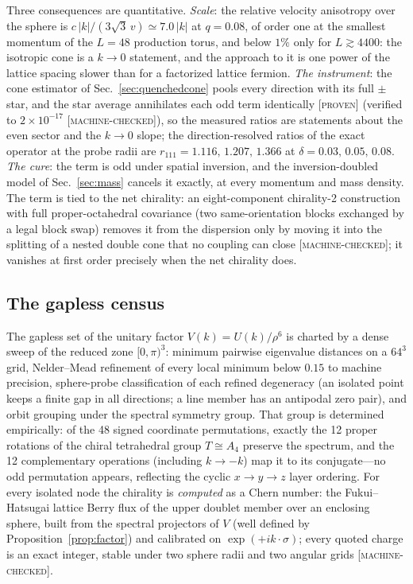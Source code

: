 \documentclass[aps,prd,twocolumn,superscriptaddress,nofootinbib,floatfix]{revtex4-2}
\newcommand{\evP}{\textnormal{\textsc{[proven]}}}
\newcommand{\evM}{\textnormal{\textsc{[machine-checked]}}}
\begin{document}
Three consequences are quantitative. \emph{Scale}: the relative
velocity anisotropy over the sphere is
$c\,|k|/(3\sqrt3\,v)\simeq7.0\,|k|$ at $q=0.08$, of order one at the
smallest momentum of the $L=48$ production torus, and below $1\%$ only
for $L\gtrsim4400$: the isotropic cone is a $k\to0$ statement, and the
approach to it is one power of the lattice spacing slower than for a
factorized lattice fermion. \emph{The instrument}: the cone estimator
of Sec.~\ref{sec:quenchedcone} pools every direction with its full
$\pm$ star, and the star average annihilates each odd term identically
\evP{} (verified to $2\times10^{-17}$ \evM{}), so the measured ratios
are statements about the even sector and the $k\to0$ slope; the
direction-resolved ratios of the exact operator at the probe radii are
$r_{111}=1.116,\,1.207,\,1.366$ at $\delta=0.03,\,0.05,\,0.08$.
\emph{The cure}: the term is odd under spatial inversion, and the
inversion-doubled model of Sec.~\ref{sec:mass} cancels it exactly, at
every momentum and mass density. The term is tied to the net
chirality: an eight-component chirality-2
construction with full proper-octahedral covariance (two
same-orientation blocks exchanged by a legal block swap) removes it
from the dispersion only by moving it into the splitting of a nested
double cone that no coupling can close \evM{}; it vanishes at first
order precisely when the net chirality does.

\subsection{The gapless census}
\label{sec:census}

The gapless set of the unitary factor $V(k)=U(k)/\rho^6$ is charted by
a dense sweep of the reduced zone $[0,\pi)^3$: minimum pairwise
eigenvalue distances on a $64^3$ grid, Nelder--Mead refinement of every
local minimum below $0.15$ to machine precision, sphere-probe
classification of each refined degeneracy (an isolated point keeps a
finite gap in all directions; a line member has an antipodal zero
pair), and orbit grouping under the spectral symmetry group. That group
is determined empirically: of the 48 signed coordinate permutations,
exactly the 12 proper rotations of the chiral tetrahedral group
$T\cong A_4$ preserve the spectrum, and the 12 complementary operations
(including $k\to-k$) map it to its conjugate---no odd permutation
appears, reflecting the cyclic $x\to y\to z$ layer ordering. For every
isolated node the chirality is \emph{computed} as a Chern number: the
Fukui--Hatsugai lattice Berry flux of the upper doublet member over an
enclosing sphere, built from the spectral projectors of $V$ (well
defined by Proposition~\ref{prop:factor}) and calibrated on
$\exp(+ik\cdot\sigma)$; every quoted charge is an exact integer, stable
under two sphere radii and two angular grids \evM{}.
\end{document}
